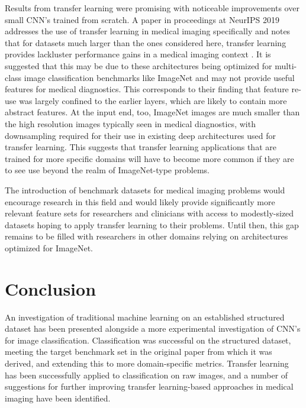 \documentclass{article}
\begin{document}
	Results from transfer learning were promising with noticeable improvements over small CNN's trained from scratch. A paper in proceedings at NeurIPS 2019 addresses the use of transfer learning in medical imaging specifically and notes that for datasets much larger than the ones considered here, transfer learning provides lackluster performance gains in a medical imaging context \cite{raghu2019transfusion}. It is suggested that this may be due to these architectures being optimized for multi-class image classification benchmarks like ImageNet and may not provide useful features for medical diagnostics. This corresponds to their finding that feature re-use was largely confined to the earlier layers, which are likely to contain more abstract features. At the input end, too, ImageNet images are much smaller than the high resolution images typically seen in medical diagnostics, with downsampling required for their use in existing deep architectures used for transfer learning. This suggests that transfer learning applications that are trained for more specific domains will have to become more common if they are to see use beyond the realm of ImageNet-type problems. 
	
	The introduction of benchmark datasets for medical imaging problems would encourage research in this field and would likely provide significantly more relevant feature sets for researchers and clinicians with access to modestly-sized datasets hoping to apply transfer learning to their problems. Until then, this gap remains to be filled with researchers in other domains relying on architectures optimized for ImageNet.	
	
	\section{Conclusion}
	An investigation of traditional machine learning on an established structured dataset has been presented alongside a more experimental investigation of CNN's for image classification. Classification was successful on the structured dataset, meeting the target benchmark set in the original paper from which it was derived, and extending this to more domain-specific metrics. Transfer learning has been successfully applied to classification on raw images, and a number of suggestions for further improving transfer learning-based approaches in medical imaging have been identified.
	
	
	
\end{document}

